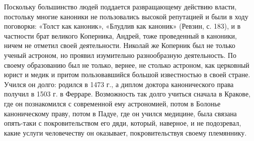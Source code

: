 Поскольку большинство людей поддается развращающему действию власти,
постольку многие каноники не пользовались высокой репутацией и были в
ходу поговорки: «Толст как каноник», «Блудлив как каноник» (Ревзин, с.
183), и в частности брат великого Коперника, Андрей, тоже проведенный
в каноники, ничем не отметил своей деятельности. Николай же Коперник
был не только ученый астроном, но проявил изумительно разнообразную
деятельность. По своему образованию был не только, вернее, не столько
астроном, как церковный юрист и медик и притом пользовавшийся большой
известностью в своей стране. Учился он долго: родился в 1473 г., а
диплом доктора канонического права получил в 1503 г. в Ферраре.
Возможность так долго учиться сначала в Кракове, где он познакомился с
современной ему астрономией, потом в Болонье каноническому праву,
потом в Падуе, где он учился медицине, была связана опять-таки с
покровительством его дяди, который, наверное, и не подозревал, какие
услуги человечеству он оказывает, покровительствуя своему племяннику.


